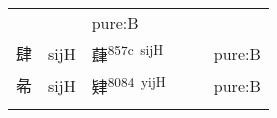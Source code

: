 \documentclass[14pt,a4paper]{scrartcl}
\begin{document}
\begin{longtable}[c]{@{}llllll@{}}
\begin{minipage}[t]{0.14\columnwidth}\raggedright\strut
\strut\end{minipage} &
\begin{minipage}[t]{0.14\columnwidth}\raggedright\strut
\strut\end{minipage} &
\begin{minipage}[t]{0.14\columnwidth}\raggedright\strut
pure:B
\strut\end{minipage}\tabularnewline
\begin{minipage}[t]{0.14\columnwidth}\raggedright\strut
肆
\strut\end{minipage} &
\begin{minipage}[t]{0.14\columnwidth}\raggedright\strut
sijH
\strut\end{minipage} &
\begin{minipage}[t]{0.14\columnwidth}\raggedright\strut
蕼\textsuperscript{857c~sijH}
\strut\end{minipage} &
\begin{minipage}[t]{0.14\columnwidth}\raggedright\strut
\strut\end{minipage} &
\begin{minipage}[t]{0.14\columnwidth}\raggedright\strut
\strut\end{minipage} &
\begin{minipage}[t]{0.14\columnwidth}\raggedright\strut
pure:B
\strut\end{minipage}\tabularnewline
\begin{minipage}[t]{0.14\columnwidth}\raggedright\strut
㣇
\strut\end{minipage} &
\begin{minipage}[t]{0.14\columnwidth}\raggedright\strut
sijH
\strut\end{minipage} &
\begin{minipage}[t]{0.14\columnwidth}\raggedright\strut
肄\textsuperscript{8084~yijH}
\strut\end{minipage} &
\begin{minipage}[t]{0.14\columnwidth}\raggedright\strut
\strut\end{minipage} &
\begin{minipage}[t]{0.14\columnwidth}\raggedright\strut
\strut\end{minipage} &
\begin{minipage}[t]{0.14\columnwidth}\raggedright\strut
pure:B
\strut\end{minipage}\tabularnewline
\begin{minipage}[t]{0.14\columnwidth}\raggedright\strut

\end{minipage}
\end{longtable}
\end{document}
